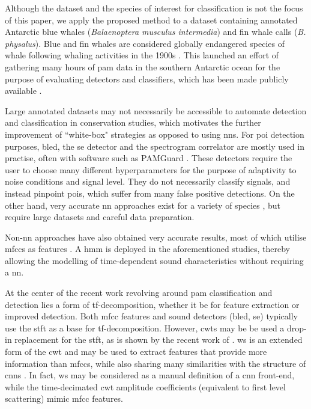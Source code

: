 Although the dataset and the species of interest for classification is not the focus of this paper, we apply the proposed method to a dataset containing annotated Antarctic blue whales (\textit{Balaenoptera musculus intermedia}) and fin whale calls (\textit{B. physalus}). Blue and fin whales are considered globally endangered species of whale following whaling activities in the 1900s \citep{blue_whale, fin_whale}. This launched an effort of gathering many hours of \ac{pam} data in the southern Antarctic ocean \citep{sorp_sohn} for the purpose of evaluating detectors and classifiers, which has been made publicly available \citep{casey2017}.


Large annotated datasets may not necessarily be accessible to automate detection and classification in conservation studies, which motivates the further improvement of ``white-box" strategies as opposed to using \acp{nn}. For \ac{poi} detection purposes, \ac{bled}, the \ac{se} detector and the spectrogram correlator \citep{casey2017} are mostly used in practise, often with software such as PAMGuard \citep{PAMGuard}. These detectors require the user to choose many different hyperparameters for the purpose of adaptivity to noise conditions and signal level. They do not necessarily classify signals, and instead pinpoint \acp{poi}, which suffer from many false positive detections. On the other hand, very accurate \ac{nn} approaches exist for a variety of species \citep{alexnet_killer_whales, cnn_multiple_whale_classes, narw_cn_denoising, cnn_fin_whale}, but require large datasets and careful data preparation.


Non-\ac{nn} approaches have also obtained very accurate results, most of which utilise \acp{mfcc} as features \citep{MFCC_HMM_birds, mfcc_hmm_brydes}. A \ac{hmm} is deployed in the aforementioned studies, thereby allowing the modelling of time-dependent sound characteristics without requiring a \ac{nn}.

At the center of the recent work revolving around \ac{pam} classification and detection lies a form of \ac{tf}-decomposition, whether it be for feature extraction or improved detection. Both \ac{mfcc} features and sound detectors (\ac{bled}, \ac{se}) typically use the \ac{stft} as a base for \ac{tf}-decomposition. However, \acp{cwt} may be be used a drop-in replacement for the \ac{stft}, as is shown by the recent work of \citet{mypaper}. \Ac{ws} is an extended form of the \ac{cwt} and may be used to extract features that provide more information than \acp{mfcc}, while also sharing many similarities with the structure of \acp{cnn} \citep{ws}. In fact, \ac{ws} may be considered as a manual definition of a \ac{cnn} front-end, while the time-decimated \ac{cwt} amplitude coefficients (equivalent to first level scattering) mimic \ac{mfcc} features.

